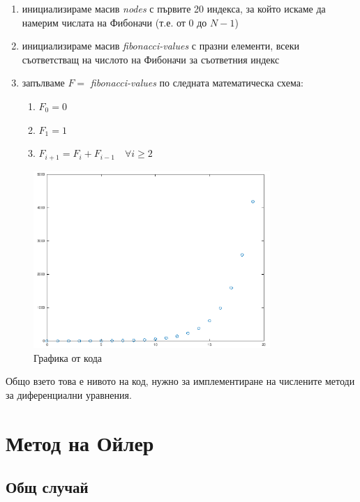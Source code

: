 \documentclass{scrartcl}
\begin{document}
\begin{flushleft}
\begin{enumerate}
    \item инициализираме масив \textit{nodes} с първите 20 индекса, за който искаме да намерим числата на Фибоначи (т.е. от $0$ до $N-1$)
    \item инициализираме масив \textit{fibonacci-values} с празни елементи, всеки съответстващ на числото на Фибоначи за съответния индекс
    \item запълваме $F =$ \textit{fibonacci-values} по следната математическа схема:
    \begin{enumerate}
        \item $F_{0} = 0$
        \item $F_{1} = 1$
        \item $F_{i+1} = F_{i} + F_{i-1}\quad \forall i \ge 2$
    \end{enumerate}
\end{enumerate}



\begin{figure}[H]
    \centering
    \includegraphics[width=0.8\textwidth]{fib_picture.png}
    \caption{Графика от кода}
    \label{fig:wolfram_sol}
\end{figure}

Общо взето това е нивото на код, нужно за имплементиране на числените методи за диференциални уравнения.

\end{flushleft}

\section{Метод на Ойлер}

\subsection{Общ случай}
\end{document}
